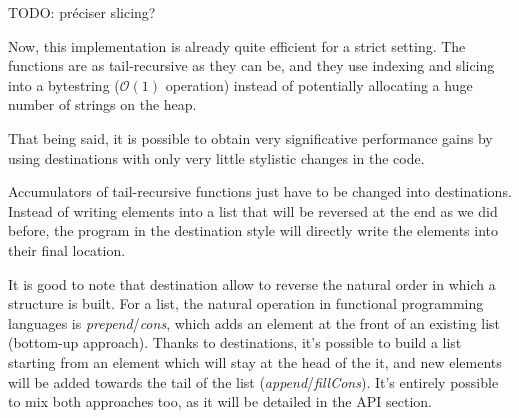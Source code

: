 \documentclass[english]{jflart}
\begin{document}
TODO: préciser slicing?

Now, this implementation is already quite efficient for a strict setting. The functions are as tail-recursive as they can be, and they use indexing and slicing into a bytestring ($\mathcal{O}(1)$ operation) instead of potentially allocating a huge number of strings on the heap.

That being said, it is possible to obtain very significative performance gains by using destinations with only very little stylistic changes in the code.

Accumulators of tail-recursive functions just have to be changed into destinations. Instead of writing elements into a list that will be reversed at the end as we did before, the program in the destination style will directly write the elements into their final location.

It is good to note that destination allow to reverse the natural order in which a structure is built. For a list, the natural operation in functional programming languages is \emph{prepend}/\emph{cons}, which adds an element at the front of an existing list (bottom-up approach). Thanks to destinations, it's possible to build a list starting from an element which will stay at the head of the it, and new elements will be added towards the tail of the list (\emph{append}/\emph{fillCons}). It's entirely possible to mix both approaches too, as it will be detailed in the API section.

\newcommand{\mnew}[1]{\colorbox{green}{#1}}
\newcommand{\mold}[1]{\colorbox{red}{\sout{#1}}}
\end{document}
